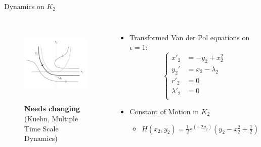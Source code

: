 \documentclass[11pt]{beamer}
\begin{document}
\begin{frame}{Dynamics on $K_2$}
\begin{columns}
\begin{figure}
    \centering
    \includegraphics[height=4cm,width=6cm]{Dynamics_in_K2.png}
    \caption{\textbf{Needs changing} (Kuehn, Multiple Time Scale Dynamics)}

\end{figure}
\begin{itemize}
\item Transformed Van der Pol equations on $ \epsilon=1$:
\begin{equation*}
    \begin{cases}
        x'_2&=-y_2+x_2^2\\
         y_2'&=x_2-\lambda_2\\
        r'_2&=0\\
        \lambda'_2&=0\\
    \end{cases}
\end{equation*}
\item Constant of Motion in $ K_2 $
\begin{itemize}
	\item $H(x_2,y_2)=\frac{1}{2}e^{(-2y_2)}\left(y_2-x^2_2+\frac{1}{2}\right)$
\end{itemize}

\end{itemize}
\end{columns}
\end{frame}
\end{document}

